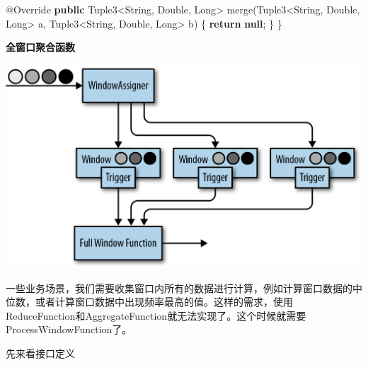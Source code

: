 \documentclass[cn,11pt,chinese]{elegantbook}
\newenvironment{Shaded}{}{}
\newcommand{\AttributeTok}[1]{\textcolor[rgb]{0.49,0.56,0.16}{#1}}
\newcommand{\BuiltInTok}[1]{#1}
\newcommand{\FunctionTok}[1]{\textcolor[rgb]{0.02,0.16,0.49}{#1}}
\newcommand{\KeywordTok}[1]{\textcolor[rgb]{0.00,0.44,0.13}{\textbf{#1}}}
\newcommand{\NormalTok}[1]{#1}
\begin{document}
\begin{Shaded}
\begin{Highlighting}[]
    \AttributeTok{@Override}
    \KeywordTok{public}\NormalTok{ Tuple3\textless{}}\BuiltInTok{String}\NormalTok{, }\BuiltInTok{Double}\NormalTok{, }\BuiltInTok{Long}\NormalTok{\textgreater{} }\FunctionTok{merge}\NormalTok{(Tuple3\textless{}}\BuiltInTok{String}\NormalTok{, }\BuiltInTok{Double}\NormalTok{, }\BuiltInTok{Long}\NormalTok{\textgreater{} a, Tuple3\textless{}}\BuiltInTok{String}\NormalTok{, }\BuiltInTok{Double}\NormalTok{, }\BuiltInTok{Long}\NormalTok{\textgreater{} b) \{}
        \KeywordTok{return} \KeywordTok{null}\NormalTok{;}
\NormalTok{    \}}
\NormalTok{\}}
\end{Highlighting}
\end{Shaded}

\textbf{全窗口聚合函数}

\includegraphics{images/spaf_0605.png}

一些业务场景，我们需要收集窗口内所有的数据进行计算，例如计算窗口数据的中位数，或者计算窗口数据中出现频率最高的值。这样的需求，使用ReduceFunction和AggregateFunction就无法实现了。这个时候就需要ProcessWindowFunction了。

先来看接口定义
\end{document}
